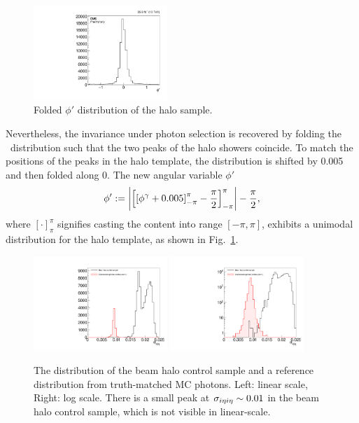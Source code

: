 \begin{figure}[tbp]
  \begin{center}
    \includegraphics[width=0.45\textwidth]{Reconstruction/Figures/halo/haloPhiFolded.pdf}
    \caption{
      Folded $\phi'$ distribution of the halo sample.
    }
    \label{fig:halo_template}
  \end{center}
\end{figure}

Nevertheless, the invariance under photon selection is recovered by folding the \phig\ distribution such that the two peaks of the halo showers coincide.
To match the positions of the peaks in the halo template, the distribution is shifted by 0.005 and then folded along 0. 
The new angular variable $\phi'$
\begin{equation}
  \phi' := \left|\left[\left[\phi^{\gamma} + 0.005\right]_{-\pi}^{\pi} - \frac{\pi}{2}\right]_{-\pi}^{\pi}\right| - \frac{\pi}{2},
\end{equation}
where $[\cdot]_{\pi}^{\pi}$ signifies casting the content into range $[-\pi,\pi]$,
exhibits a unimodal distribution for the halo template, as shown in Fig.~\ref{fig:halo_template}.

\begin{figure}[tbp]
  \begin{center}
    \includegraphics[width=0.45\textwidth]{Reconstruction/Figures/halo/halo_sieie.pdf}
    \includegraphics[width=0.45\textwidth]{Reconstruction/Figures/halo/halo_sieie_log.pdf}
    \caption{
      The \sieie distribution of the beam halo control sample and a reference distribution from truth-matched MC photons. 
      Left: linear scale, Right: log scale. 
      There is a small peak at $\sigma_{i\eta i\eta} \sim 0.01$ in the beam halo control sample, which is not visible in linear-scale.
    }
    \label{fig:halo_sieie}
  \end{center}
\end{figure}

